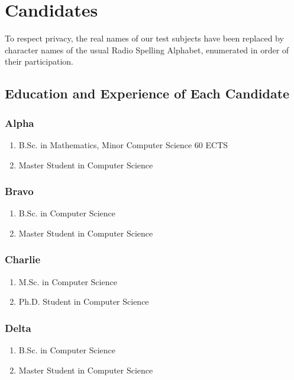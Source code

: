 \documentclass[english]{acm_proc_article-sp}
\begin{document}
\section{Candidates}
To respect privacy, the real names of our test subjects have been replaced by character names of the usual Radio Spelling Alphabet, enumerated in order of their participation.

\subsection{Education and Experience of Each Candidate}
\subsubsection{Alpha} %
\begin{enumerate}[$-$]
\item B.Sc. in Mathematics, Minor Computer Science 60 ECTS
\item Master Student in Computer Science
\end{enumerate}

\subsubsection{Bravo} %
\begin{enumerate}[$-$]
\item B.Sc. in Computer Science
\item Master Student  in Computer Science
\end{enumerate}

\subsubsection{Charlie} %
\begin{enumerate}[$-$]
\item M.Sc. in Computer Science
\item Ph.D. Student in Computer Science
\end{enumerate}

\subsubsection{Delta} %
\begin{enumerate}[$-$]
\item B.Sc. in Computer Science
\item Master Student  in Computer Science
\end{enumerate}
\end{document}
